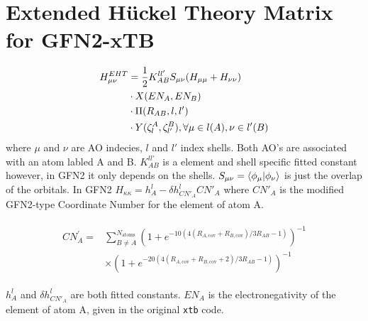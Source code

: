 \chapter{Extended Hückel Theory Matrix for GFN2-xTB}
\begin{equation}
\begin{split}
    H^{EHT}_{\mu\nu} &= \frac{1}{2}K^{ll'}_{AB}S_{\mu\nu}(H_{\mu\mu}+H_{\nu\nu})\\&\cdot X(EN_A,EN_B)\\&\cdot \Pi(R_{AB},l,l')\\&\cdot Y(\zeta^A_l,\zeta^B_{l'}), \forall \mu \in l(A), \nu \in l'(B)
\end{split}
\end{equation}
where $\mu$ and $\nu$ are AO indecies, $l$ and $l'$ index shells. Both AO's are associated with an atom labled A and B. 
$K^{ll'}_{AB}$ is a element and shell specific fitted constant however, in GFN2 it only depends on the shells. 
$S_{\mu\nu}=\braket{\phi_\mu|\phi_\nu}$ is just the overlap of the orbitals. In GFN2 $H_{\kappa\kappa}=h^l_A-\delta h^l_{CN'_A}CN'_A$ where $CN'_A$ is the modified GFN2-type Coordinate Number for the element of atom A.

\begin{align}
\begin{split}
  CN^{'}_A = &\sum^{N_\text{atoms}}_{B \neq A} (1 + e^{-10(4(R_{A,\text{cov}} + R_{B,\text{cov}})/3R_{AB}-1)})^{-1} \\
             &\times (1 + e^{-20(4(R_{A,\text{cov}} + R_{B,\text{cov}} + 2)/3R_{AB}-1)})^{-1}
\end{split}
\end{align}

$h^l_A$ and $\delta h^l_{CN'_A}$ are both fitted constants. $EN_A$ is the electronegativity of the element of atom A, given in the original \texttt{xtb} code. 

